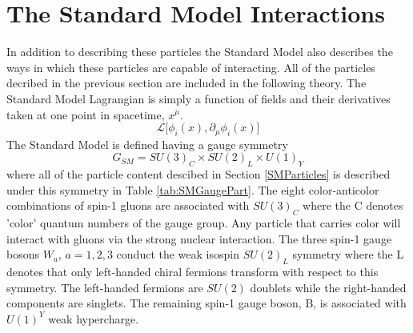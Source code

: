\section{The Standard Model Interactions}
In addition to describing these particles the Standard Model also describes the ways in which these particles are capable of interacting.  All of the particles decribed in the previous section are included in the following theory.  The Standard Model Lagrangian is simply a function of fields and their derivatives taken at one point in spacetime, $x^{\mu}$.  
 \[ \mathcal{L} \lbrack \phi_{i}(x),\partial_{\mu}\phi_{i}(x) \rbrack \] 
The Standard Model is defined having a gauge symmetry
\[ G_{SM} =SU(3)_C \times SU(2)_L \times U(1)_Y \]
where all of the particle content descibed in Section \ref{SMParticles} is described under this symmetry in Table \ref{tab:SMGaugePart}\cite{GrossmanLecture}.  The eight color-anticolor combinations of spin-1 gluons are associated with $SU(3)_C$ where the C denotes 'color' quantum numbers of the gauge group.  Any particle that carries color will interact with gluons via the strong nuclear interaction.  The three spin-1 gauge bosons $W_a$, $a=1,2,3$ conduct the weak isospin $SU(2)_L$ symmetry where the L denotes that only left-handed chiral fermions transform with respect to this symmetry.  The left-handed fermions are $SU(2)$ doublets while the right-handed components are singlets.  The remaining spin-1 gauge boson, B, is associated with $U(1)^Y$ weak hypercharge.  
